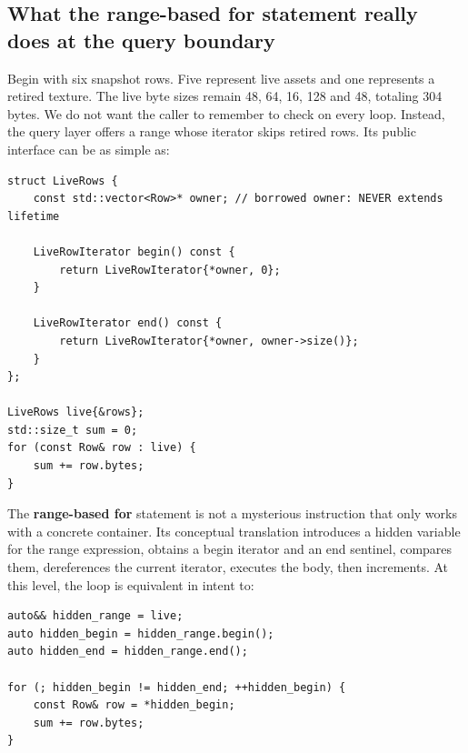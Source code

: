 \subsection{What the range-based for statement really does at the query boundary}\label{01-foundations-i-ch006-what-the-range-based-for-statement-really-does-at-the-query-boundary}

\hypertarget{01-foundations-i-ch006-what-the-range-based-for-statement-really-does-at-the-query-boundary}{}

Begin with six snapshot rows. Five represent live assets and one represents a retired texture. The live byte sizes remain 48, 64, 16, 128 and 48, totaling 304 bytes. We do not want the caller to remember to check  on every loop. Instead, the query layer offers a range whose iterator skips retired rows. Its public interface can be as simple as:

\begin{verbatim}
struct LiveRows {
    const std::vector<Row>* owner; // borrowed owner: NEVER extends lifetime

    LiveRowIterator begin() const {
        return LiveRowIterator{*owner, 0};
    }

    LiveRowIterator end() const {
        return LiveRowIterator{*owner, owner->size()};
    }
};

LiveRows live{&rows};
std::size_t sum = 0;
for (const Row& row : live) {
    sum += row.bytes;
}
\end{verbatim}

The \textbf{range-based for} statement is not a mysterious instruction that only works with a concrete container. Its conceptual translation introduces a hidden variable for the range expression, obtains a begin iterator and an end sentinel, compares them, dereferences the current iterator, executes the body, then increments. At this level, the loop is equivalent in intent to:

\begin{verbatim}
auto&& hidden_range = live;
auto hidden_begin = hidden_range.begin();
auto hidden_end = hidden_range.end();

for (; hidden_begin != hidden_end; ++hidden_begin) {
    const Row& row = *hidden_begin;
    sum += row.bytes;
}
\end{verbatim}

